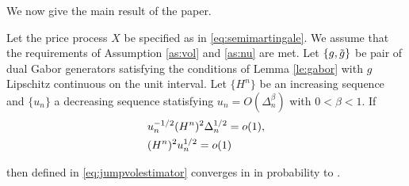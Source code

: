 \begin{comment}
First, we state some obvious results.
\begin{lem}
 Let the price process  $X$ be specified as in  \eqref{eq:semimartingale}. Then,
 \begin{enumerate}
   \item $(x^2 \wedge 1) \ast \mu$ is locally integrable.
   \item $(\vert x \vert I_{\{\vert x \vert > 1\}}) \ast \mu$ is locally integrable.
 \end{enumerate}
\end{lem}
The first statement follows because $(x^2 \wedge 1) \ast \mu_t$ is dominated by $ (x^2I_{\{\vert x \vert \le 1\}}) \ast \mu_t$ and $ (I_{\{\vert x \vert > 1\}}) \ast \mu_t$, which  are increasing processes with bounded jumps and, therefore, locally integrable.    
\end{comment}
We now give the main result of the paper.
\begin{prop} \label{pro:infinity}
  Let the price process  $X$ be specified as in  \eqref{eq:semimartingale}. We assume that the requirements of Assumption \ref{as:vol} and \ref{as:nu} are met. Let $\{g, \tilde{g}\}$ be pair of dual Gabor generators satisfying the conditions of Lemma \eqref{le:gabor} with $g$  Lipschitz continuous on the unit interval. Let  $\{H^n\}$ be an increasing sequence and   $\{u_n\}$  a decreasing sequence statisfying $u_n = O(\Delta_n^\beta)$ with   $0 <\beta<1$. If  
  \begin{align}
    &u_n^{-1/2}(H^n)^2\Delta_n^{1/2} = o(1), \notag\\
    &(H^n)^2u^{1/2}_n = o(1)
    \label{eq:smallo}
  \end{align} 
  \begin{comment}and   that $\nu$ satisfies 
   \begin{align}
    (x^2 \wedge u_n^{1/2}) \ast \nu_1 = o((H^n)^{-2}).
    \label{eq:smallo}
  \end{align}
  \end{comment}
  then  \jvn defined in \eqref{eq:jumpvolestimator} converges in \Ltwo in probability to \sv.
\end{prop}
